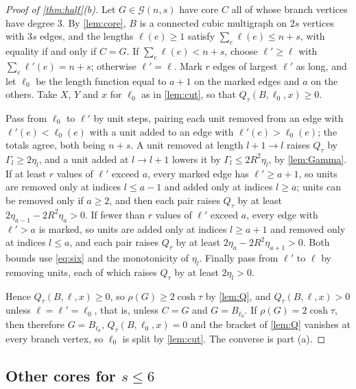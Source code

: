 \documentclass[11pt]{article}
\theoremstyle{definition}
\theoremstyle{remark}
\newcommand{\G}{\mathcal{G}}
\begin{document}
\begin{proof}[Proof of \cref{thm:half}(b)]
Let $G\in\G(n,s)$ have core $C$ all of whose branch vertices have degree $3$. By \cref{lem:core}, $B$ is a connected
cubic multigraph on $2s$ vertices with $3s$ edges, and the lengths $\ell(e)\ge1$ satisfy $\sum_e\ell(e)\le n+s$, with
equality if and only if $C=G$. If $\sum_e\ell(e)<n+s$, choose $\ell'\ge\ell$ with $\sum_e\ell'(e)=n+s$; otherwise
$\ell'=\ell$. Mark $r$ edges of largest $\ell'$ as long, and let $\ell_0$ be the length function equal to $a+1$ on the
marked edges and $a$ on the others. Take $X$, $Y$ and $x$ for $\ell_0$ as in \cref{lem:cut}, so that
$Q_\tau(B,\ell_0,x)\ge0$.

Pass from $\ell_0$ to $\ell'$ by unit steps, pairing each unit removed from an edge with $\ell'(e)<\ell_0(e)$ with a
unit added to an edge with $\ell'(e)>\ell_0(e)$; the totals agree, both being $n+s$. A unit removed at length $l+1\to l$
raises $Q_\tau$ by $\Gamma_l\ge2\eta_l$, and a unit added at $l\to l+1$ lowers it by $\Gamma_l\le2R^2\eta_l$, by
\cref{lem:Gamma}. If at least $r$ values of $\ell'$ exceed $a$, every marked edge has $\ell'\ge a+1$, so units are
removed only at indices $l\le a-1$ and added only at indices $l\ge a$; units can be removed only if $a\ge2$, and then
each pair raises $Q_\tau$ by at least $2\eta_{a-1}-2R^2\eta_a>0$. If fewer than $r$ values of $\ell'$ exceed $a$, every
edge with $\ell'>a$ is marked, so units are added only at indices $l\ge a+1$ and removed only at indices $l\le a$, and
each pair raises $Q_\tau$ by at least $2\eta_a-2R^2\eta_{a+1}>0$. Both bounds use \eqref{eq:six} and the monotonicity
of $\eta_l$. Finally pass from $\ell'$ to $\ell$ by removing units, each of which raises $Q_\tau$ by at least
$2\eta_l>0$.

Hence $Q_\tau(B,\ell,x)\ge0$, so $\rho(G)\ge2\cosh\tau$ by \cref{lem:Q}, and $Q_\tau(B,\ell,x)>0$ unless
$\ell=\ell'=\ell_0$, that is, unless $C=G$ and $G=B_{\ell_0}$. If $\rho(G)=2\cosh\tau$, then therefore $G=B_{\ell_0}$,
$Q_\tau(B,\ell_0,x)=0$ and the bracket of \cref{lem:Q} vanishes at every branch vertex, so $\ell_0$ is split by
\cref{lem:cut}. The converse is part (a).
\end{proof}

\subsection{Other cores for \texorpdfstring{$s\le6$}{s at most 6}}
\end{document}
